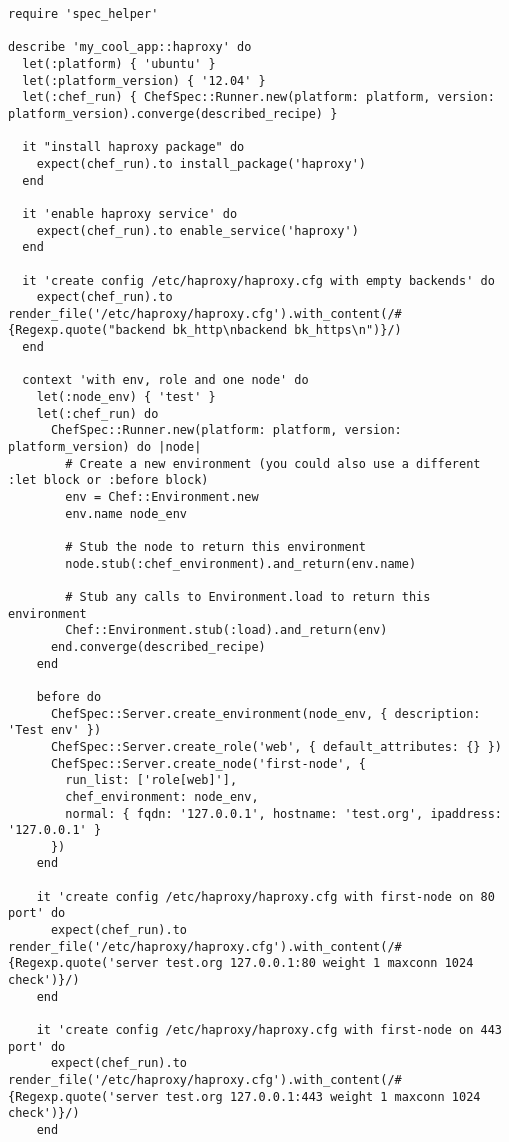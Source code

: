 \begin{lstlisting}[label=lst:testing-chef-zero15]
require 'spec_helper'

describe 'my_cool_app::haproxy' do
  let(:platform) { 'ubuntu' }
  let(:platform_version) { '12.04' }
  let(:chef_run) { ChefSpec::Runner.new(platform: platform, version: platform_version).converge(described_recipe) }

  it "install haproxy package" do
    expect(chef_run).to install_package('haproxy')
  end

  it 'enable haproxy service' do
    expect(chef_run).to enable_service('haproxy')
  end

  it 'create config /etc/haproxy/haproxy.cfg with empty backends' do
    expect(chef_run).to render_file('/etc/haproxy/haproxy.cfg').with_content(/#{Regexp.quote("backend bk_http\nbackend bk_https\n")}/)
  end

  context 'with env, role and one node' do
    let(:node_env) { 'test' }
    let(:chef_run) do
      ChefSpec::Runner.new(platform: platform, version: platform_version) do |node|
        # Create a new environment (you could also use a different :let block or :before block)
        env = Chef::Environment.new
        env.name node_env

        # Stub the node to return this environment
        node.stub(:chef_environment).and_return(env.name)

        # Stub any calls to Environment.load to return this environment
        Chef::Environment.stub(:load).and_return(env)
      end.converge(described_recipe)
    end

    before do
      ChefSpec::Server.create_environment(node_env, { description: 'Test env' })
      ChefSpec::Server.create_role('web', { default_attributes: {} })
      ChefSpec::Server.create_node('first-node', {
        run_list: ['role[web]'],
        chef_environment: node_env,
        normal: { fqdn: '127.0.0.1', hostname: 'test.org', ipaddress: '127.0.0.1' }
      })
    end

    it 'create config /etc/haproxy/haproxy.cfg with first-node on 80 port' do
      expect(chef_run).to render_file('/etc/haproxy/haproxy.cfg').with_content(/#{Regexp.quote('server test.org 127.0.0.1:80 weight 1 maxconn 1024 check')}/)
    end

    it 'create config /etc/haproxy/haproxy.cfg with first-node on 443 port' do
      expect(chef_run).to render_file('/etc/haproxy/haproxy.cfg').with_content(/#{Regexp.quote('server test.org 127.0.0.1:443 weight 1 maxconn 1024 check')}/)
    end


\end{lstlisting}
